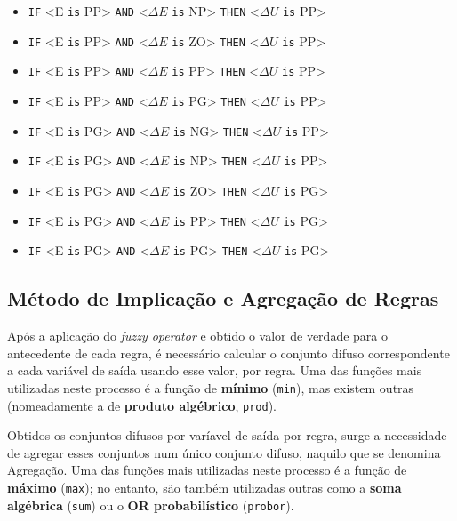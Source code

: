 \documentclass{article}
\begin{document}
\begin{itemize}
	\item \texttt{IF} <E \texttt{is} PP> \texttt{AND} <$\Delta E$ \texttt{is} NP> \texttt{THEN} <$\Delta U$ \texttt{is} PP>
	\item \texttt{IF} <E \texttt{is} PP> \texttt{AND} <$\Delta E$ \texttt{is} ZO> \texttt{THEN} <$\Delta U$ \texttt{is} PP>
	\item \texttt{IF} <E \texttt{is} PP> \texttt{AND} <$\Delta E$ \texttt{is} PP> \texttt{THEN} <$\Delta U$ \texttt{is} PP>
	\item \texttt{IF} <E \texttt{is} PP> \texttt{AND} <$\Delta E$ \texttt{is} PG> \texttt{THEN} <$\Delta U$ \texttt{is} PP>
	\item \texttt{IF} <E \texttt{is} PG> \texttt{AND} <$\Delta E$ \texttt{is} NG> \texttt{THEN} <$\Delta U$ \texttt{is} PP>
	\item \texttt{IF} <E \texttt{is} PG> \texttt{AND} <$\Delta E$ \texttt{is} NP> \texttt{THEN} <$\Delta U$ \texttt{is} PP>
	\item \texttt{IF} <E \texttt{is} PG> \texttt{AND} <$\Delta E$ \texttt{is} ZO> \texttt{THEN} <$\Delta U$ \texttt{is} PG>
	\item \texttt{IF} <E \texttt{is} PG> \texttt{AND} <$\Delta E$ \texttt{is} PP> \texttt{THEN} <$\Delta U$ \texttt{is} PG>
	\item \texttt{IF} <E \texttt{is} PG> \texttt{AND} <$\Delta E$ \texttt{is} PG> \texttt{THEN} <$\Delta U$ \texttt{is} PG>
\end{itemize}

\clearpage

\subsection{Método de Implicação e Agregação de Regras}
Após a aplicação do \textit{fuzzy operator} e obtido o valor de verdade para o antecedente de cada regra, é necessário calcular o conjunto difuso correspondente a cada variável de saída usando esse valor, por regra. Uma das funções mais utilizadas neste processo é a função de \textbf{mínimo} (\texttt{min}), mas existem outras (nomeadamente a de \textbf{produto algébrico}, \texttt{prod}).

Obtidos os conjuntos difusos por varíavel de saída por regra, surge a necessidade de agregar esses conjuntos num único conjunto difuso, naquilo que se denomina Agregação. Uma das funções mais utilizadas neste processo é a função de \textbf{máximo} (\texttt{max}); no entanto, são também utilizadas outras como a \textbf{soma algébrica} (\texttt{sum}) ou o \textbf{OR probabilístico} (\texttt{probor}).
\end{document}
